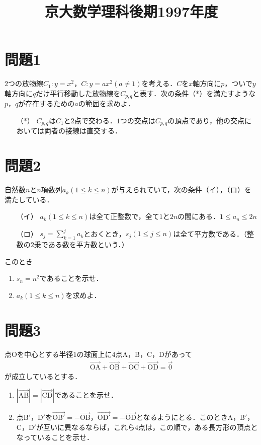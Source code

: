 \documentclass[unicode,12pt, A4j]{ltjsarticle}%
\title{京大数学理科後期1997年度}
\author{}
\date{}
\begin{document}
\maketitle

\section{問題1}
$2$つの放物線$C_1:y=x^2$，$C:y=ax^2(a\neq 1)$を考える．$C$を$x$軸方向に$p$，ついで$y$軸方向に$q$だけ平行移動した放物線を$C_{p,q}$と表す．次の条件（*）を満たすような$p$，$q$が存在するための$a$の範囲を求めよ．
\begin{itemize}
 \item[（*）] $C_{p,q}$は$C_1$と$2$点で交わる．$1$つの交点は$C_{p,q}$の頂点であり，他の交点においては両者の接線は直交する．
\end{itemize}

\section{問題2}
自然数$n$と$n$項数列$a_k (1\le k\le n)$が与えられていて，次の条件（イ），（ロ）を満たしている．
\begin{itemize}
 \item[（イ）] $a_k(1\le k\le n)$は全て正整数で，全て$1$と$2n$の間にある．$1\le a_n\le 2n$
 \item[（ロ）] $s_j=\sum_{k=1}^{j}a_k$とおくとき，$s_j(1\le j\le n)$は全て平方数である．（整数の$2$乗である数を平方数という．）
\end{itemize}
このとき
\begin{enumerate}
 \item $s_n=n^2$であることを示せ．
 \item $a_k(1\le k\le n)$を求めよ．
\end{enumerate}

\section{問題3}
点$\mathrm{O}$を中心とする半径$1$の球面上に$4$点$\mathrm{A}$，$\mathrm{B}$，$\mathrm{C}$，$\mathrm{D}$があって
\begin{align*}
 \overrightarrow{\mathrm{OA}}+ \overrightarrow{\mathrm{OB}}+ \overrightarrow{\mathrm{OC}}+ \overrightarrow{\mathrm{OD}}=\overrightarrow{0}
\end{align*}
が成立しているとする．
\begin{enumerate}
 \item $|\overrightarrow{\mathrm{AB}}|=|\overrightarrow{\mathrm{CD}}|$であることを示せ．
 \item 点$\mathrm{B'}$，$\mathrm{D'}$を$\overrightarrow{\mathrm{OB'}}=-\overrightarrow{\mathrm{OB}}$，$\overrightarrow{\mathrm{OD'}}=-\overrightarrow{\mathrm{OD}}$となるようにとる．このとき$\mathrm{A}$，$\mathrm{B}'$，$\mathrm{C}$，$\mathrm{D}'$が互いに異なるならば，これら$4$点は，この順で，ある長方形の頂点となっていることを示せ．
\end{enumerate}
\end{document}
